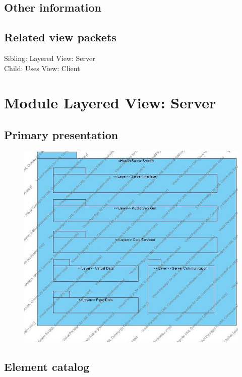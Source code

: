 \documentclass[a4paper,10pt]{article}
\begin{document}
\subsection{Other information}

\subsection{Related view packets}

Sibling: Layered View: Server\\
Child: Uses View: Client\\


\section{Module Layered View: Server}

\subsection{Primary presentation}
\begin{center}
    \begin{figure}[h!]
      \includegraphics[width=\textwidth]{../images/LayeredView_Server.jpg}
    \end{figure}
  \end{center}

\subsection{Element catalog}
\end{document}
